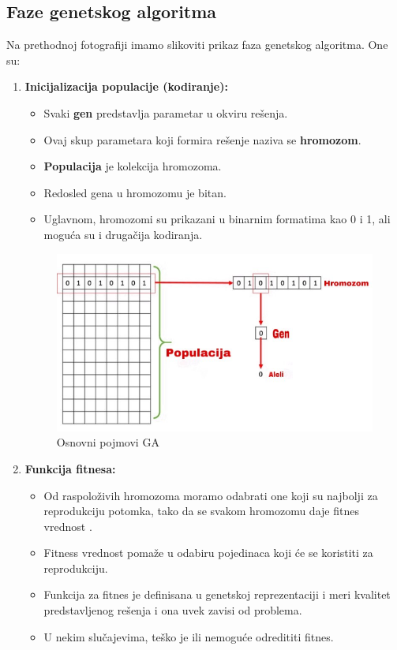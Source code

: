 \documentclass[a4paper]{article}
\begin{document}
\subsection{Faze genetskog algoritma}
\vspace{5mm} 
Na prethodnoj fotografiji imamo slikoviti prikaz faza genetskog algoritma. One su:
\begin{enumerate}
	\item \textbf{Inicijalizacija populacije (kodiranje):}
	\begin{itemize}
	    \item Svaki \textbf{gen} predstavlja parametar u okviru rešenja.
        \item Ovaj skup parametara koji formira rešenje naziva se \textbf{hromozom}.
        \item \textbf{Populacija} je kolekcija hromozoma.
        \item Redosled gena u hromozomu je bitan.
        \item Uglavnom, hromozomi su prikazani u binarnim formatima kao 0 i 1, ali moguća su i drugačija kodiranja.
    \end{itemize}
    
\begin{figure}[h]
    \centering
    \includegraphics[scale=0.3]{oznake.jpg}
    \caption{Osnovni pojmovi GA}
    \label{fig:parts}
\end{figure}
	     
    \item \textbf{Funkcija fitnesa:}
    \begin{itemize}
	    \item Od raspoloživih hromozoma moramo odabrati one koji su najbolji za reprodukciju potomka, tako da se svakom hromozomu daje fitnes vrednost .
        \item Fitness vrednost pomaže u odabiru pojedinaca koji će se koristiti za reprodukciju.
        \item  Funkcija za fitnes je definisana u genetskoj reprezentaciji i meri kvalitet predstavljenog rešenja i ona uvek zavisi od problema.
        \item U nekim slučajevima, teško je ili nemoguće odredititi fitnes. 
    \end{itemize}
     

\end{enumerate}
\end{document}
